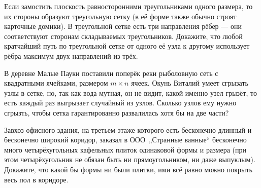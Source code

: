 ﻿
\begin{enumerate}

\itA Если замостить плоскость равносторонними треугольниками одного размера, то их стороны образуют треугольную сетку (в её форме также обычно строят карточные домики). В треугольной сетке есть три направления рёбер — они соответствуют сторонам складываемых треугольников. Докажите, что любой кратчайший путь по треугольной сетке от одного её узла к другому использует рёбра максимум двух направлений из трёх.

\itB В деревне Малые Пауки поставили поперёк реки рыболовную сеть с квадратными ячейками, размером $m \times n$ ячеек. Окунь Виталий умеет сгрызать узлы в сетке, но, так как вода мутная, он не видит, какой именно узел грызёт, то есть каждый раз выгрызает случайный из узлов. Сколько узлов ему нужно сгрызть, чтобы сетка гарантированно развалилась хотя бы на две части?

\itC Завхоз офисного здания, на третьем этаже которого есть бесконечно длинный и бесконечно широкий коридор, заказал в ООО~„Странные ванные“ бесконечно много четырёхугольных кафельных плиток одинаковой формы и размера (при этом четырёхугольник не обязан быть ни прямоугольником, ни даже выпуклым). Докажите, что какой бы формы ни были плитки, ими всё равно можно покрыть весь пол в коридоре.
\end{enumerate}